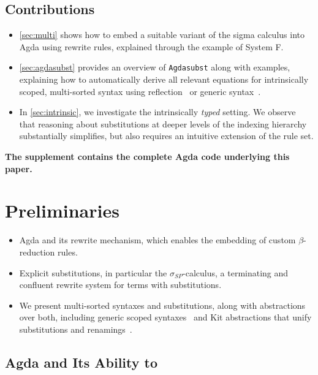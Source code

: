 \documentclass[screen,nonacm]{acmart}
\begin{document}
\subsection*{Contributions}

\begin{itemize}
  \item \cref{sec:multi} shows how to embed a suitable variant of the
        sigma calculus into Agda using rewrite rules, explained through the example of System F.

  \item \cref{sec:agdasubst} provides an overview of \texttt{Agdasubst} along with examples,
        explaining how to automatically derive all relevant equations for intrinsically scoped,
        multi-sorted syntax using reflection~\cite{saffrich:LIPIcs.ITP.2024.32}
        or generic syntax~\cite{allais2021typescopesafeuniverse}.

  \item In \cref{sec:intrinsic}, we investigate the intrinsically \emph{typed} setting.
        We observe that reasoning about substitutions at deeper levels of the indexing
        hierarchy substantially simplifies, but also requires an intuitive extension of
        the rule set.
\end{itemize}

\textbf{The supplement contains the complete Agda code underlying this paper.}

\section{Preliminaries}\label{sec:preliminaries}

\begin{itemize}
  \item Agda and its rewrite mechanism, which enables the embedding of custom
        $\beta$-reduction rules.
  \item Explicit substitutions, in particular the $\sigma_{SP}$-calculus, a terminating
        and confluent rewrite system for terms with substitutions.
  \item We present multi-sorted syntaxes and substitutions, along with abstractions
        over both, including generic scoped
        syntaxes~\cite{allais2021typescopesafeuniverse} and Kit abstractions that unify
        substitutions and renamings~\cite{stronglytyped,ren-sub}.
\end{itemize}

\subsection{Agda and Its Ability to }
\end{document}
